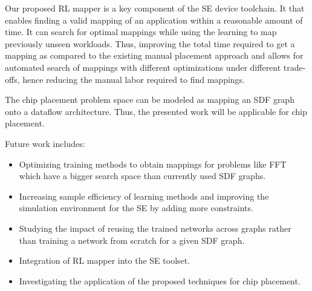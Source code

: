 Our proposed RL mapper is a key component of the SE device toolchain.
It that enables finding a valid mapping of an application within a reasonable amount of time.
It can search for optimal mappings while using the learning to map previously unseen workloads.
Thus, improving the total time required to get a mapping as compared to the existing manual placement approach and allows for automated search of mappings with different optimizations under different trade-offs, hence reducing the manual labor required to find mappings. 

The chip placement problem space can be modeled as mapping an SDF graph onto a dataflow architecture.
Thus, the presented work will be applicable for chip placement.

Future work includes: 
\begin{itemize}
    \item Optimizing training methods to obtain mappings for problems like FFT which have a bigger search space than currently used SDF graphs. 
    \item Increasing sample efficiency of learning methods and improving the simulation environment for the SE by adding more constraints. 
    \item Studying the impact of reusing the trained networks across graphs rather than training a network from scratch for a given SDF graph.
    \item Integration of RL mapper into the SE toolset.
    \item Investigating the application of the proposed techniques for chip placement.
\end{itemize}